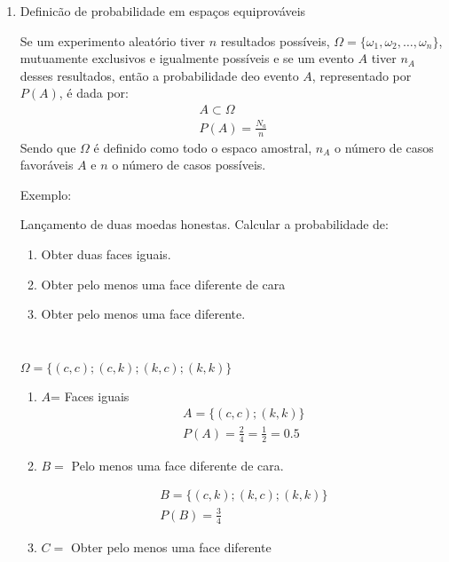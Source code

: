 \documentclass[11pt,a4paper]{book}
\begin{document}
\begin{enumerate}[label=(\alph*)]
  \item Definicão de probabilidade em espaços equiprováveis

    Se um experimento aleatório tiver $n$ resultados possíveis, $\Omega = \{ \omega_1,\omega_2,\ldots,\omega_n \}$, mutuamente exclusivos e igualmente possíveis e se um evento $A$ tiver $n_A$ desses resultados, então a probabilidade deo evento $A$, representado por $P(A)$, é dada por: 
    \begin{align}
      A \subset \Omega \nonumber\\
      P(A)= \frac{N_a}{n} 
    \end{align}
    Sendo que $\Omega$ é definido como todo o espaco amostral, $n_A$ o número de casos favoráveis $A$ e $n$ o número de casos possíveis.

    Exemplo: 

    Lançamento de duas moedas honestas. Calcular a probabilidade de: 
    \begin{enumerate}
      \item  Obter duas faces iguais.
      \item Obter pelo menos uma face diferente de cara
        \item  Obter pelo menos uma face diferente.
    \end{enumerate}

    \begin{table}[]
      \centering
      \caption{}
      \label{}
      \begin{tabular}{}
        
      \end{tabular}
    \end{table}
    $\Omega = \{ (c,c); (c,k); (k,c) ; (k,k)\}$

    \begin{enumerate}
      \item $A$= Faces iguais
        \begin{align*}
          A= \{ (c,c) ; (k,k) \} \\
          P(A) = \frac{2}{4} = \frac{1}{2}= 0.5
        \end{align*}
      \item $B=$ Pelo menos uma face diferente de cara.

        \begin{align}
          B= \{ (c,k); (k,c); (k,k) \}\\
          P(B)= \frac{3}{4}
        \end{align}
        \item  $C=$ Obter pelo menos uma face diferente


\end{enumerate}
\end{enumerate}
\end{document}
